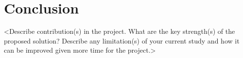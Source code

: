 \section{Conclusion}
\label{sec:conclusion}

<Describe contribution(s) in the project. What are the key strength(s) of the
proposed solution? Describe any limitation(s) of your current study and how it
can be improved given more time for the project.>
